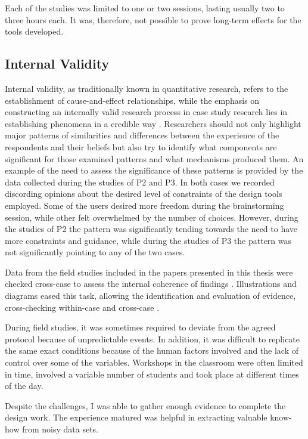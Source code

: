 Each of the studies was limited to one or two sessions, lasting usually two to three hours each. It was, therefore, not possible to prove long-term effects for the tools developed.

\subsection{Internal Validity}
Internal validity, as traditionally known in quantitative research, refers to the establishment of cause-and-effect relationships, while the emphasis on constructing an internally valid research process in case study research lies in establishing phenomena in a credible way \autocite{riege_validity_2003}. Researchers should not only highlight major patterns of similarities and differences between the experience of the respondents and their beliefs but also try to identify what components are significant for those examined patterns and what mechanisms produced them. An example of the need to assess the significance of these patterns is provided by the data collected during the studies of P2 and P3. In both cases we recorded discording opinions about the desired level of constraints of the design tools employed. Some of the users desired more freedom during the brainstorming session, while other felt overwhelmed by the number of choices. However, during the studies of P2 the pattern was significantly tending towards the need to have more constraints and guidance, while during the studies of P3 the pattern was not significantly pointing to any of the two cases.

Data from the field studies included in the papers presented in this thesis were checked cross-case to assess the internal coherence of findings \autocite{miles_qualitative_1994}. Illustrations and diagrams eased this task, allowing the identification and evaluation of evidence, cross-checking within-case and cross-case \autocite{yin_case_2017}.

During field studies, it was sometimes required to deviate from the agreed protocol because of unpredictable events. In addition, it was difficult to replicate the same exact conditions because of the human factors involved and the lack of control over some of the variables. Workshops in the classroom were often limited in time, involved a variable number of students and took place at different times of the day.

Despite the challenges, I was able to gather enough evidence to complete the design work. The experience matured was helpful in extracting valuable know-how from noisy data sets.

